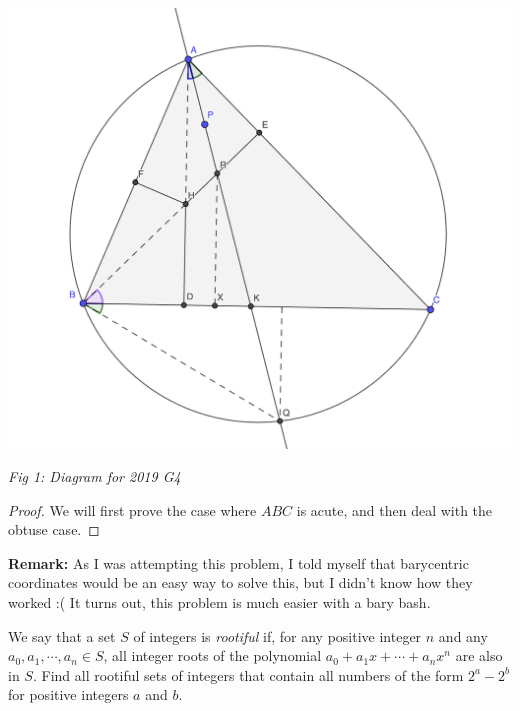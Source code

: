 \documentclass{article}
\theoremstyle{mytheoremstyle}
\theoremstyle{mytheoremstyle}
\theoremstyle{myproblemstyle}
\begin{document}
    \begin{center}
        \includegraphics[scale=0.4]{2019 G4.png}

        \textit{Fig 1: Diagram for 2019 G4}
    \end{center}

    \begin{proof}
        We will first prove the case where $ABC$ is acute, and then deal with the obtuse case.
    \end{proof}

    \textbf{Remark:} As I was attempting this problem, I told myself that barycentric coordinates would be an easy way to solve this, but I didn't know how they worked :( It turns out, this problem is much easier with a bary bash. 

    \begin{problem}[2019 N3]
        We say that a set $S$ of integers is \textit{rootiful} if, for any positive integer $n$ and any $a_0, a_1, \cdots, a_n \in S$, all integer roots of the polynomial $a_0+a_1x+\cdots+a_nx^n$ are also in $S$. Find all rootiful sets of integers that contain all numbers of the form $2^a - 2^b$ for positive integers $a$ and $b$.
    \end{problem}
\end{document}
